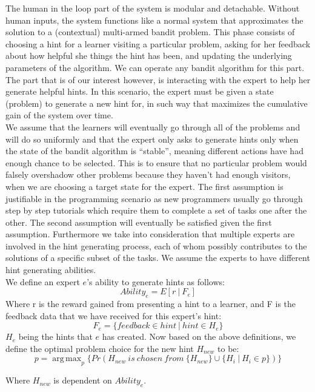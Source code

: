 \documentclass[conference]{IEEEtran}
\DeclareMathOperator*{\argmaxA}{arg\,max} %
\begin{document}
	The human in the loop part of the system is modular and detachable. Without human inputs, the system functions
	like a normal system that approximates the solution to a (contextual) multi-armed bandit problem. This phase
	consists of choosing a hint for a learner visiting a particular problem, asking for her feedback about how
	helpful she things the hint has been, and updating the underlying parameters of the algorithm. We can operate
	any bandit algorithm for this part.\\
	
	The part that is of our interest however, is interacting with the expert to help her generate helpful hints.
	In this scenario, the expert must be given a state (problem) to generate a new hint for, in such way that
	maximizes the cumulative gain of the system over time.\\
	
	We assume that the learners will eventually go through all of the problems and will do so uniformly and 
	that the expert only asks to generate hints only when the state of the bandit algorithm is ``stable'',
	meaning different actions have had enough chance to be selected. This is to ensure that no particular
	problem would falsely overshadow other problems because they haven't had enough visitors, when we are
	choosing a target state for the expert. The first assumption is justifiable in the programming scenario as
	new programmers usually go through step by step tutorials which require them to complete a set of tasks
	one after the other. The second assumption will eventually be satisfied given the first assumption.
	Furthermore we take into consideration that multiple experts are involved in the hint generating process,
	each of whom possibly contributes to the solutions of a specific subset of the tasks. We assume the experts 
	to have different hint generating abilities.\\

	We define an expert $e$'s ability to generate hints as follows:
	$$
		Ability_e =  E[r\ |\ F_e] 
	$$
	Where r is the reward gained from presenting a hint to a learner, and
	F is the feedback data that we have received for this expert's hint:
	$$
		F_e = \{feedback \in hint\ |\ hint \in H_e\}
	$$
	$H_e$ being the hints that $e$ has created.
	Now based on the above definitions, we define the optimal problem choice for the new hint $H_{new}$ to be:
	$$
	p = \argmaxA_p \{ Pr(H_{new}\ is\ chosen\ from\ \{H_{new}\} \cup \{H_{i}\ |\ H_i \in p\})\}
	$$
	
	Where $H_{new}$ is dependent on $Ability_e$.\\
	
\end{document}
